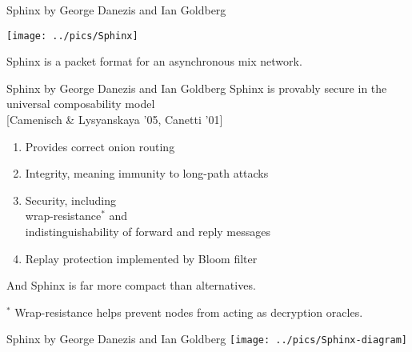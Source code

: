 \documentclass[fleqn,xcolor={usenames,dvipsnames}]{beamer}
\begin{document}
\begin{frame}{Sphinx by George Danezis and Ian Goldberg}

\begin{center}
\texttt{[image: ../pics/Sphinx]}

Sphinx is a packet format for an asynchronous mix network. 

\end{center}
\end{frame}


\begin{frame}{Sphinx by George Danezis and Ian Goldberg}
Sphinx is provably secure in the universal composability model \\
\hspace*{2pt} [Camenisch \& Lysyanskaya '05, Canetti '01]
\begin{enumerate}
\item Provides correct onion routing
\item Integrity, meaning immunity to long-path attacks
\item Security, including \\
\hspace*{2pt} wrap-resistance{\small $^*$} and \\
\hspace*{2pt} indistinguishability of forward and reply messages
\item[] Replay protection implemented by Bloom filter
\end{enumerate}

\bigskip

And Sphinx is far more compact than alternatives.


\bigskip

{\small $^*$ Wrap-resistance helps prevent nodes from acting as decryption oracles.}
\end{frame}


\begin{frame}{Sphinx by George Danezis and Ian Goldberg}
\texttt{[image: ../pics/Sphinx-diagram]}
\end{frame}


\def\mathcomma{}
\end{document}

